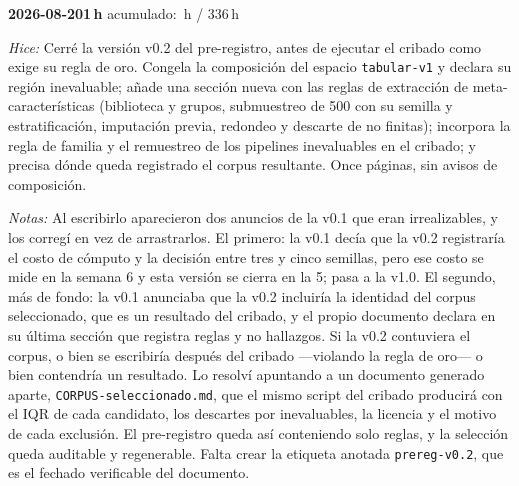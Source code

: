 \documentclass[11pt,letterpaper]{article}
\newcommand{\presupuesto}{336}
\newcommand{\horasacum}{0}
\newcommand{\entrada}[4]{%
  \xdef\horasacum{\fpeval{\horasacum + #2}}%
  \par\medskip
  \noindent\textbf{\color{tecnavy}#1}\quad\textbf{#2\,h}%
  \hfill{\small\color{gris}acumulado: \horasacum\,h / \presupuesto\,h}\par
  \nopagebreak
  \noindent\textit{Hice:} #3\par
  \nopagebreak
  \noindent\textit{Notas:} #4\par
}
\begin{document}
\entrada{2026-08-20}{1}
{Cerré la versión v0.2 del pre-registro, antes de ejecutar el cribado como exige su regla
 de oro. Congela la composición del espacio \texttt{tabular-v1} y declara su región
 inevaluable; añade una sección nueva con las reglas de extracción de meta-características
 (biblioteca y grupos, submuestreo de 500 con su semilla y estratificación, imputación
 previa, redondeo y descarte de no finitas); incorpora la regla de familia y el remuestreo
 de los pipelines inevaluables en el cribado; y precisa dónde queda registrado el corpus
 resultante. Once páginas, sin avisos de composición.}
{Al escribirlo aparecieron dos anuncios de la v0.1 que eran irrealizables, y los corregí en
 vez de arrastrarlos. El primero: la v0.1 decía que la v0.2 registraría el costo de cómputo
 y la decisión entre tres y cinco semillas, pero ese costo se mide en la semana 6 y esta
 versión se cierra en la 5; pasa a la v1.0. El segundo, más de fondo: la v0.1 anunciaba que
 la v0.2 incluiría la identidad del corpus seleccionado, que es un resultado del cribado, y
 el propio documento declara en su última sección que registra reglas y no hallazgos. Si la
 v0.2 contuviera el corpus, o bien se escribiría después del cribado —violando la regla de
 oro— o bien contendría un resultado. Lo resolví apuntando a un documento generado aparte,
 \texttt{CORPUS-seleccionado.md}, que el mismo script del cribado producirá con el IQR de
 cada candidato, los descartes por inevaluables, la licencia y el motivo de cada exclusión.
 El pre-registro queda así conteniendo solo reglas, y la selección queda auditable y
 regenerable. Falta crear la etiqueta anotada \texttt{prereg-v0.2}, que es el fechado
 verificable del documento.}
\end{document}
